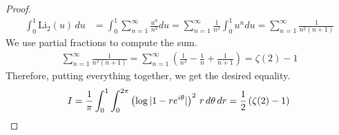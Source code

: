 \documentclass[9pt,a4paper,reqno]{amsart}
\theoremstyle{mine}
\theoremstyle{definition}
\theoremstyle{remark}
\begin{document}
\begin{proof}
\begin{align*}
\int_0^1 \text{Li}_2(u) \, du &= \int_0^1 \sum_{n=1}^\infty \frac{u^n}{n^2} du = \sum_{n=1}^\infty \frac{1}{n^2} \int_0^1 u^n du = \sum_{n=1}^\infty \frac{1}{n^2(n+1)}
\end{align*}
 We use partial fractions to compute the sum.
\begin{align*}
\sum_{n=1}^\infty \frac{1}{n^2(n+1)} = \sum_{n=1}^\infty \left( \frac{1}{n^2} - \frac{1}{n} + \frac{1}{n+1} \right)  = \zeta(2) - 1
\end{align*}
Therefore, putting everything together, we get the desired equality.
\begin{equation*}
I = \frac{1}{\pi} \int_0^1 \int_0^{2\pi} \left( \log |1 - r e^{i\theta}| \right)^2 \, r \, d\theta \, dr = \frac{1}{2} \left(\zeta(2) - 1 \right) \qedhere
\end{equation*}

\end{proof}

\end{document}
